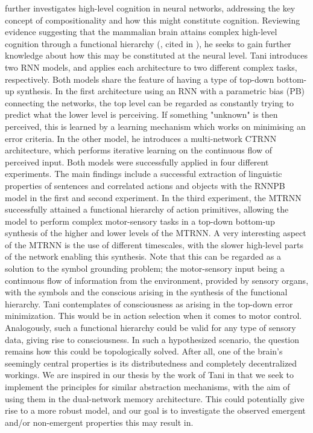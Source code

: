 \cite{Tani2014} further investigates high-level cognition in neural networks, addressing the key concept of compositionality and how this might constitute cognition. Reviewing evidence suggesting that the mammalian brain attains complex high-level cognition through a functional hierarchy (\cite{Miyake2000, Koechlin2003, Fuster2008}, cited in \cite{Tani2014}), he seeks to gain further knowledge about how this may be constituted at the neural level. Tani introduces two RNN models, and applies each architecture to two different complex tasks, respectively. Both models share the feature of having a type of top-down bottom-up synthesis. In the first architecture using an RNN with a parametric bias (PB) connecting the networks, the top level can be regarded as constantly trying to predict what the lower level is perceiving. If something "unknown" is then perceived, this is learned by a learning mechanism which works on minimising an error criteria. In the other model, he introduces a multi-network CTRNN architecture, which performs iterative learning on the continuous flow of perceived input. Both models were successfully applied in four different experiments. The main findings include a successful extraction of linguistic properties of sentences and correlated actions and objects with the RNNPB model in the first and second experiment. In the third experiment, the MTRNN successfully attained a functional hierarchy of action primitives, allowing the model to perform complex motor-sensory tasks in a top-down bottom-up synthesis of the higher and lower levels of the MTRNN. A very interesting aspect of the MTRNN is the use of different timescales, with the slower high-level parts of the network enabling this synthesis. Note that this can be regarded as a solution to the symbol grounding problem; the motor-sensory input being a continuous flow of information from the environment, provided by sensory organs, with the symbols and the conscious arising in the synthesis of the functional hierarchy. Tani contemplates of consciousness as arising in the top-down error minimization. This would be in action selection when it comes to motor control. Analogously, such a functional hierarchy could be valid for any type of sensory data, giving rise to consciousness. In such a hypothesized scenario, the question remains how this could be topologically solved. After all, one of the brain's seemingly central properties is its distributedness and completely decentralized workings. We are inspired in our thesis by the work of Tani in that we seek to implement the principles for similar abstraction mechanisms, with the aim of using them in the dual-network memory architecture. This could potentially give rise to a more robust model, and our goal is to investigate the observed emergent and/or non-emergent properties this may result in.


